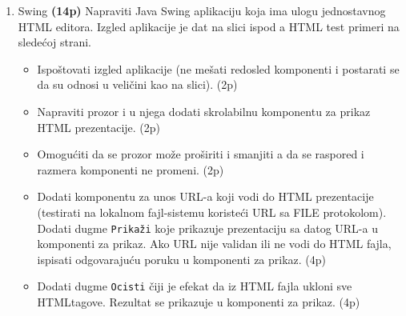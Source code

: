 \documentclass[]{article}
\begin{document}
\begin{enumerate}
  \item Swing \textbf{(14p)}
  Napraviti Java Swing aplikaciju koja ima ulogu jednostavnog HTML editora. Izgled aplikacije je dat na slici ispod a HTML test primeri na slede\'c{}oj strani.
  \begin{itemize}
    \item Ispo\v{s}tovati izgled aplikacije (ne me\v{s}ati redosled komponenti i postarati se da su odnosi u veli\v{c}ini kao na slici). \hfill (2p)
    \item Napraviti prozor i u njega dodati skrolabilnu komponentu za prikaz HTML prezentacije. \hfill (2p)
    \item Omogu\'c{}iti da se prozor mo\v{z}e pro\v{s}iriti i smanjiti a da se raspored i razmera komponenti ne promeni. \hfill (2p)
    \item Dodati komponentu za unos URL-a koji vodi do HTML prezentacije (testirati na lokalnom fajl-sistemu koriste\'c{}i URL sa FILE protokolom). Dodati dugme \texttt{Prika\v{z}i} koje prikazuje prezentaciju sa datog URL-a u komponenti za prikaz. Ako URL nije validan ili ne vodi do HTML fajla, ispisati odgovaraju\'c{}u poruku u komponenti za prikaz. \hfill (4p)
    \item Dodati dugme \texttt{Ocisti} \v{c}iji je efekat da iz HTML fajla ukloni sve HTMLtagove. Rezultat se prikazuje u komponenti za prikaz. \hfill (4p)
  \end{itemize}


\end{enumerate}
\end{document}

